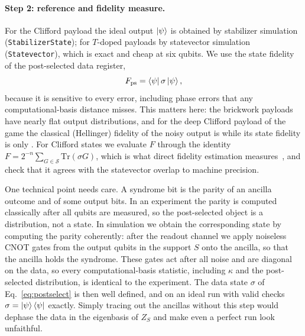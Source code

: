 \paragraph*{Step 2: reference and fidelity measure.} For the Clifford payload the ideal output $\ket{\psi}$ is obtained by stabilizer simulation (\texttt{StabilizerState}); for $T$-doped payloads by statevector simulation (\texttt{Statevector}), which is exact and cheap at six qubits. We use the state fidelity of the post-selected data register,
\begin{equation}
  F_{\mathrm{ps}}=\bra{\psi}\sigma\ket{\psi},
\end{equation}
because it is sensitive to every error, including phase errors that any computational-basis distance misses. This matters here: the brickwork payloads have nearly flat output distributions, and for the deep Clifford payload of the game the classical (Hellinger) fidelity of the noisy output is \HzeroDeep{} while its state fidelity is only \FzeroDeep. For Clifford states we evaluate $F$ through the identity $F=2^{-n}\sum_{G\in\mathcal S}\mathrm{Tr}(\sigma G)$, which is what direct fidelity estimation measures~\cite{flammia2011direct,dasilva2011practical}, and check that it agrees with the statevector overlap to machine precision.

One technical point needs care. A syndrome bit is the parity of an ancilla outcome and of some output bits. In an experiment the parity is computed classically after all qubits are measured, so the post-selected object is a distribution, not a state. In simulation we obtain the corresponding state by computing the parity coherently: after the readout channel we apply noiseless CNOT gates from the output qubits in the support $S$ onto the ancilla, so that the ancilla holds the syndrome. These gates act after all noise and are diagonal on the data, so every computational-basis statistic, including $\kappa$ and the post-selected distribution, is identical to the experiment. The data state $\sigma$ of Eq.~\eqref{eq:postselect} is then well defined, and on an ideal run with valid checks $\sigma=\ket\psi\bra\psi$ exactly. Simply tracing out the ancillas without this step would dephase the data in the eigenbasis of $Z_S$ and make even a perfect run look unfaithful.

